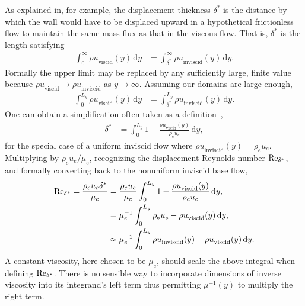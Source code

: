 As explained in, for example, \citet[\textsection{}9.2]{Dowling2012} the
displacement thickness $\delta^\ast$ is the distance by which the wall would
have to be displaced upward in a hypothetical frictionless flow to maintain the
same mass flux as that in the viscous flow.  That is, $\delta^\ast$ is the
length satisfying
\begin{align}
    \int_0^\infty {\rho u}_\text{viscid} (y) \, \mathrm{d}y
&=
    \int_{\delta^\ast}^\infty {\rho u}_\text{inviscid} (y) \, \mathrm{d}y.
\end{align}
Formally the upper limit may be replaced by any sufficiently large, finite
value because ${\rho u}_\text{viscid} \to {\rho u}_\text{inviscid}$ as
$y\to\infty$.  Assuming our domains are large enough,
\begin{align}
    \int_0^{L_y} {\rho u}_\text{viscid} (y) \, \mathrm{d}y
&=
    \int_{\delta^\ast}^{L_y} {\rho u}_\text{inviscid} (y) \, \mathrm{d}y.
    \label{eq:dispthick_general}
\end{align}
One can obtain a simplification often taken as a definition~\citep[Equation
10.95]{Schlichting2000Boundary},
\begin{align}
    \delta^\ast
&=
    \int_0^{L_y} 1 - \frac{{\rho u}_\text{viscid} (y)}{\rho_e u_e} \, \mathrm{d}y,
    \label{eq:dispthick_const}
\end{align}
for the special case of a uniform inviscid flow where ${\rho u}_\text{inviscid}
(y) = \rho_e u_e$.
%
Multiplying by $\rho_e u_e / \mu_e$, recognizing the displacement Reynolds
number $\Reynolds[\delta^\ast]{}$, and formally converting back to the
nonuniform inviscid base flow,
\begin{align}
    \Reynolds[\delta^\ast]{}
=
    \frac{\rho_e u_e \delta^\ast}{\mu_e}
&=
    \frac{\rho_e u_e}{\mu_e}
    \int_0^{L_y} 1 - \frac{{\rho u}_\text{viscid} (y)}{\rho_e u_e} \, \mathrm{d}y,
\notag\\&=
    \mu_e^{-1}
    \int_0^{L_y} \rho_e u_e - {\rho u}_\text{viscid} (y) \, \mathrm{d}y,
\notag\\&\approx
    \mu_e^{-1}
    \int_0^{L_y} {\rho u}_\text{inviscid}(y) - {\rho u}_\text{viscid} (y) \, \mathrm{d}y.
    \label{eq:dispreynolds_general}
\end{align}
A constant viscosity, here chosen to be $\mu_e$, should scale the
above integral when defining $\Reynolds[\delta^\ast]{}$.  There is no sensible
way to incorporate dimensions of inverse viscosity into its integrand's left
term thus permitting $\mu^{-1}(y)$ to multiply the right term.


